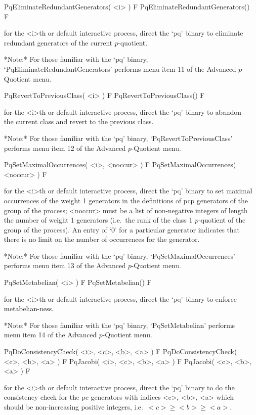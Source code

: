 \>PqEliminateRedundantGenerators( <i> ) F
\>PqEliminateRedundantGenerators() F

for the <i>th or default interactive {\ANUPQ} process, direct  the  `pq'
binary to eliminate redundant generators of the current $p$-quotient.

*Note:* 
For those familiar with the `pq' binary, `PqEliminateRedundantGenerators'
performs menu item 11 of the Advanced $p$-Quotient menu.

\>PqRevertToPreviousClass( <i> ) F
\>PqRevertToPreviousClass() F

for the <i>th or default interactive {\ANUPQ} process, direct  the  `pq'
binary to abandon the current class and revert to the previous class.

*Note:*
For  those  familiar  with  the  `pq'  binary,  `PqRevertToPreviousClass'
performs menu item 12 of the Advanced $p$-Quotient menu.

\>PqSetMaximalOccurrences( <i>, <noccur> ) F
\>PqSetMaximalOccurrences( <noccur> ) F

for the <i>th or default interactive {\ANUPQ} process, direct  the  `pq'
binary to set maximal occurrences of  the  weight  1  generators  in  the
definitions of pcp generators of the group of the process; <noccur>  must
be a list of non-negative integers of  length  the  number  of  weight  1
generators (i.e.~the rank of the class 1 $p$-quotient of the group of the
process). An entry of `0' for a particular generator indicates that there
is no limit on the number of occurrences for the generator.

*Note:*
For  those  familiar  with  the  `pq'  binary,  `PqSetMaximalOccurrences'
performs menu item 13 of the Advanced $p$-Quotient menu.

\>PqSetMetabelian( <i> ) F
\>PqSetMetabelian() F

for the <i>th or default interactive {\ANUPQ} process,  direct  the  `pq'
binary to enforce metabelian-ness.

*Note:* 
For those familiar  with  the  `pq'  binary,  `PqSetMetabelian'  performs
menu item 14 of the Advanced $p$-Quotient menu.

\>PqDoConsistencyCheck( <i>, <c>, <b>, <a> ) F
\>PqDoConsistencyCheck( <c>, <b>, <a> ) F
\>PqJacobi( <i>, <c>, <b>, <a> ) F
\>PqJacobi( <c>, <b>, <a> ) F

for the <i>th or default interactive {\ANUPQ} process,  direct  the  `pq'
binary to do the consistency check for the  pc  generators  with  indices
<c>, <b>, <a> which should be non-increasing positive integers, i.e.~$<c>
\ge <b> \ge <a>$.

